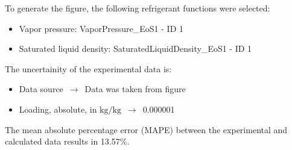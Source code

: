 To generate the figure, the following refrigerant functions were selected:
\begin{itemize}
\item Vapor pressure: VaporPressure\_EoS1 - ID 1
\item Saturated liquid density: SaturatedLiquidDensity\_EoS1 - ID 1
\end{itemize}

The uncertainity of the experimental data is:
\begin{itemize}
\item Data source $\,\to\,$ Data was taken from figure
\item Loading, absolute, in $\si{\kilogram\per\kilogram}$ $\,\to\,$ 0.000001
\end{itemize}

The mean absolute percentage error (MAPE) between the experimental and calculated data results in 13.57\%.
\FloatBarrier
\newpage
